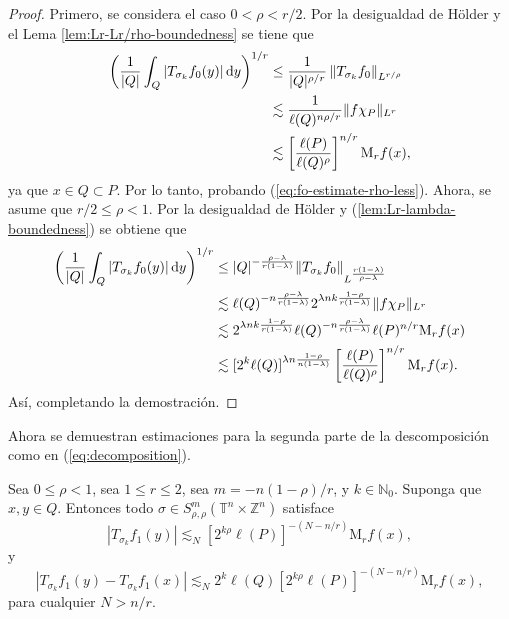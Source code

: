 \begin{proof}
	Primero, se considera el caso $0<\rho<r/2$. Por la desigualdad de H\"older y el Lema \ref{lem:Lr-Lr/rho-boundedness} se tiene que 
	\begin{align*}
		\left(
		\frac{1}{|Q|} \int_Q |T_{\sigma_k}f_0(y)|\mathop{}\!\mathrm{d} y
		\right)^{1/r} &\leq \frac{1}{|Q|^{\rho/r}} \left\| T_{\sigma_k}f_0  \right\|_{L^{r/\rho}} \\
		& \lesssim \frac{1}{\ell(Q)^{n\rho/r}} \|f \chi_P \|_{L^r} \\
		& \lesssim \left[ \frac{\ell(P)}{\ell(Q)^\rho} 
		\right]^{n/r} \mathrm{M}_rf(x),
	\end{align*}
	ya que $x \in Q \subset P$. Por lo tanto, probando (\ref{eq:fo-estimate-rho-less}). Ahora, se asume que $r/2\leq \rho<1$. Por la desigualdad de H\"older y (\ref{lem:Lr-lambda-boundedness}) se obtiene que 
	\begin{align*}
		\left(
		\frac{1}{|Q|} \int_Q |T_{\sigma_k}f_0(y)|\mathop{}\!\mathrm{d} y
		\right)^{1/r} &\leq {|Q|^{-\frac{\rho-\lambda}{r(1-\lambda)}}} \|T_{\sigma_k}f_0\|_{L^\frac{r(1-\lambda)}{\rho-\lambda}} \\
		&\lesssim {\ell(Q)^{-n\frac{\rho-\lambda}{r(1-\lambda)}}} 2^{\lambda nk\frac{1-\rho}{r(1-\lambda)}} \|f\chi_P\|_{L^r}  \\
		& \lesssim 2^{\lambda nk\frac{1-\rho}{r(1-\lambda)}}\ell(Q)^{-n\frac{\rho-\lambda}{r(1-\lambda)}} \ell(P)^{n/r} \mathrm{M}_rf(x)\\
		&\lesssim[2^k\ell(Q)]^{\lambda n\frac{1-\rho}{n(1-\lambda)}} 
		\left[ \frac{\ell(P)}{\ell(Q)^\rho}
		\right]^{n/r} \mathrm{M}_rf(x).
	\end{align*}
	Así, completando la demostración.
\end{proof}
Ahora se demuestran estimaciones para la segunda parte de la descomposición como en (\ref{eq:decomposition}).
\begin{proposition}
	Sea $0\leq \rho<1$, sea $1\leq r\leq2$, sea $m=-n(1-\rho)/r$, y $k\in\mathbb{N}_0$. Suponga que $x, y \in Q$. Entonces todo $\sigma \in S^m_{\rho,\rho}(\mathbb{T}^n \times \mathbb{Z}^n) $ satisface
	\begin{equation}
		|T_{\sigma_k}f_1(y)| \lesssim_N [2^{k\rho}\ell(P)]^{-(N-n/r)} \mathrm{M}_rf(x),
		\label{eq:f1-estimate}
	\end{equation}
	y
	\begin{equation}
		|T_{\sigma_k}f_1(y) - T_{\sigma_k}f_1(x)| \lesssim_N 2^k\ell(Q) [2^{k\rho}\ell(P)]^{-(N-n/r)} \mathrm{M}_rf(x),
		\label{eq:diff-f1}
	\end{equation}
	para cualquier $N>n/r$.
\end{proposition}
